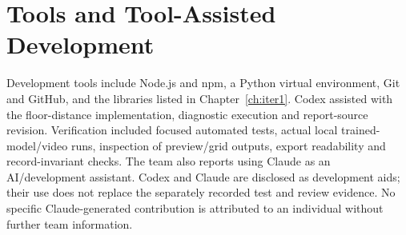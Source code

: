 \section{Tools and Tool-Assisted Development}
Development tools include Node.js and npm, a Python virtual environment, Git and GitHub, and the libraries listed in Chapter~\ref{ch:iter1}. Codex assisted with the floor-distance implementation, diagnostic execution and report-source revision. Verification included focused automated tests, actual local trained-model/video runs, inspection of preview/grid outputs, export readability and record-invariant checks. The team also reports using Claude as an AI/development assistant. Codex and Claude are disclosed as development aids; their use does not replace the separately recorded test and review evidence. No specific Claude-generated contribution is attributed to an individual without further team information.

